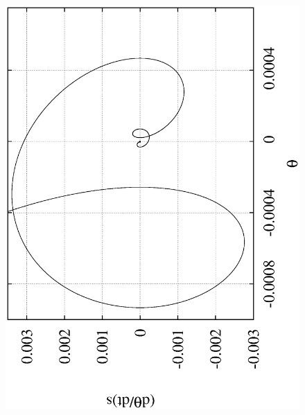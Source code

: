 \documentclass[10pt,a4paper]{article}
\begin{document}
\begin{figure}[h!]
\begin{center}
\includegraphics[scale = 0.3, angle =-90]{frac2.eps}

\end{center}
\end{figure}
\end{document}

